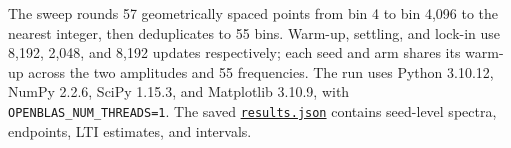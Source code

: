 The sweep rounds 57 geometrically spaced points from bin 4 to bin 4,096 to the nearest integer, then deduplicates to 55 bins. Warm-up, settling, and lock-in use 8,192, 2,048, and 8,192 updates respectively; each seed and arm shares its warm-up across the two amplitudes and 55 frequencies. The run uses Python 3.10.12, NumPy 2.2.6, SciPy 1.15.3, and Matplotlib 3.10.9, with \texttt{OPENBLAS\_NUM\_THREADS=1}. The saved \href{https://github.com/manojbajaj95/cl/blob/f018cf8/experiments/waterbed/results.json}{\texttt{results.json}} contains seed-level spectra, endpoints, LTI estimates, and intervals.
